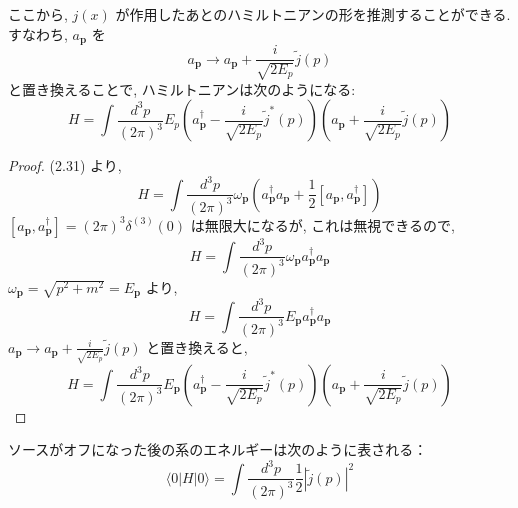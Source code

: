 \documentclass[a4paper,12pt]{article}
\begin{document}
ここから, $j(x)$ が作用したあとのハミルトニアンの形を推測することができる.\\
すなわち, $a_{\mathbf{p}}$ を
\begin{equation*}
a_{\mathbf{p}} \rightarrow a_{\mathbf{p}} + \frac{i}{\sqrt{2E_p}} \tilde{j}(p)
\end{equation*}
と置き換えることで, ハミルトニアンは次のようになる:
\begin{equation*}
H = \int \frac{d^3 p}{(2\pi)^3} E_p \left( a_{\mathbf{p}}^\dagger - \frac{i}{\sqrt{2E_p}} \tilde{j}^*(p) \right) \left( a_{\mathbf{p}} + \frac{i}{\sqrt{2E_p}} \tilde{j}(p) \right)
\end{equation*}
\color{blue}
\begin{proof}
(2.31) より,
\begin{equation*}
  H = \int \frac{d^3 p}{(2\pi)^3} \omega_{\mathbf{p}} \left( a_{\mathbf{p}}^\dagger a_{\mathbf{p}} + \frac{1}{2} [a_{\mathbf{p}}, a_{\mathbf{p}}^\dagger] \right) \tag{2-4.m1}
\end{equation*}
$[a_{\mathbf{p}}, a_{\mathbf{p}}^\dagger] = (2\pi)^3 \delta^{(3)}(0)$ は無限大になるが, これは無視できるので,
\begin{equation*}
  H = \int \frac{d^3 p}{(2\pi)^3} \omega_{\mathbf{p}} a_{\mathbf{p}}^\dagger a_{\mathbf{p}} \tag{2-4.m2}
\end{equation*}
$\omega_{\mathbf{p}} = \sqrt{p^2 + m^2} = E_{\mathbf{p}}$ より,
\begin{equation*}
  H = \int \frac{d^3 p}{(2\pi)^3} E_{\mathbf{p}} a_{\mathbf{p}}^\dagger a_{\mathbf{p}} \tag{2-4.m4}
\end{equation*}
$\displaystyle a_{\mathbf{p}} \rightarrow a_{\mathbf{p}} + \frac{i}{\sqrt{2E_p}} \tilde{j}(p)$ と置き換えると,
\begin{equation*}
  H = \int \frac{d^3 p}{(2\pi)^3} E_{\mathbf{p}} \left( a_{\mathbf{p}}^\dagger - \frac{i}{\sqrt{2E_p}} \tilde{j}^{*}(p) \right) \left( a_{\mathbf{p}} + \frac{i}{\sqrt{2E_p}} \tilde{j}(p) \right) \tag{2-4.m5}
\end{equation*}
\end{proof}
\color{black}

ソースがオフになった後の系のエネルギーは次のように表される：
\begin{equation*}
\langle 0 | H | 0 \rangle = \int \frac{d^3 p}{(2\pi)^3} \frac{1}{2} |\tilde{j}(p)|^2 \label{2.65}\tag{2.65}
\end{equation*}
\end{document}
